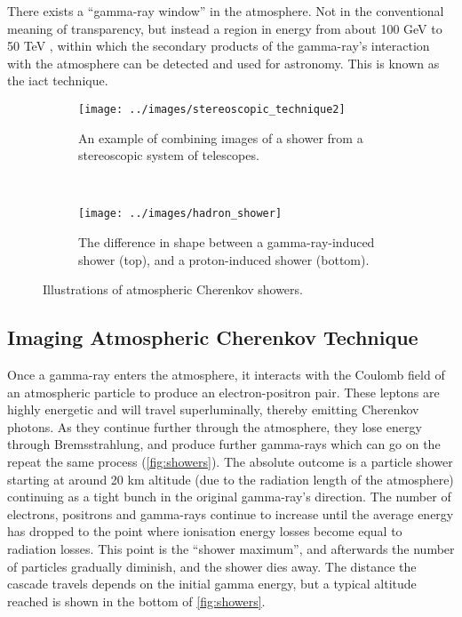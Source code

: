 \documentclass[%
amsmath,amssymb,
onecolumn,
a4paper,
10pt
]{article}%
\newcommand{\quotes}[1]{``#1''}
\begin{document}
		There exists a \quotes{gamma-ray window} in the atmosphere. Not in the conventional meaning of transparency, but instead a region in energy from about 100 GeV to 50 TeV \citep[p.~13]{weekes2003}, within which the secondary products of the gamma-ray's interaction with the atmosphere can be detected and used for astronomy. This is known as the \gls{iact} technique.
		
	\begin{figure}
		\centering
		\begin{subfigure}[b]{0.4\textwidth}
			\texttt{[image: ../images/stereoscopic\_technique2]}
			\caption{\label{fig:stereoscopic_technique2} An example of combining images of a shower from a stereoscopic system of telescopes.}
		\end{subfigure}
		~
		\begin{subfigure}[b]{0.4\textwidth}
			\texttt{[image: ../images/hadron\_shower]}
			\caption{\label{fig:hadron_shower} The difference in shape between a gamma-ray-induced shower (top), and a proton-induced shower (bottom).}
		\end{subfigure}
		\caption{Illustrations of atmospheric Cherenkov showers.}
	\end{figure}		
	
	\subsection{Imaging Atmospheric Cherenkov Technique}
	
	Once a gamma-ray enters the atmosphere, it interacts with the Coulomb field of an atmospheric particle to produce an electron-positron pair. These leptons are highly energetic and will travel superluminally, thereby emitting Cherenkov photons. As they continue further through the atmosphere, they lose energy through Bremsstrahlung, and produce further gamma-rays which can go on the repeat the same process (\autoref{fig:showers}). The absolute outcome is a particle shower starting at around 20 km altitude (due to the radiation length of the atmosphere) continuing as a tight bunch in the original gamma-ray's direction. The number of electrons, positrons and gamma-rays continue to increase until the average energy has dropped to the point where ionisation energy losses become equal to radiation losses. This point is the \quotes{shower maximum}, and afterwards the number of particles gradually diminish, and the shower dies away. The distance the cascade travels depends on the initial gamma energy, but a typical altitude reached is shown in the bottom of \autoref{fig:showers}.
\end{document}
